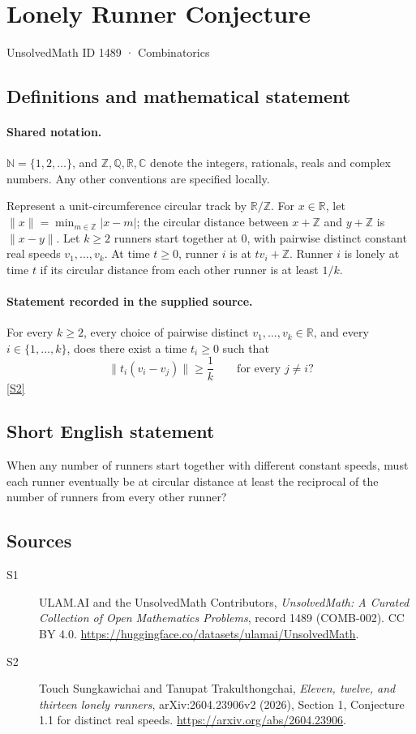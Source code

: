 \documentclass[11pt]{article}
\newcommand{\sref}[2]{\hyperlink{source:#1:#2}{[S#2]}}
\begin{document}
\setcounter{section}{1488}
\section{Lonely Runner Conjecture}\label{1489}
{\small\sffamily UnsolvedMath ID 1489 · Combinatorics}
\subsection{Definitions and mathematical statement}

\paragraph{Shared notation.}$\mathbb N=\{1,2,\ldots\}$, and $\mathbb Z,\mathbb Q,\mathbb R,\mathbb C$ denote the integers, rationals, reals and complex numbers. Any other conventions are specified locally.


Represent a unit-circumference circular track by \(\mathbb R/\mathbb Z\).
For \(x\in\mathbb R\), let \(\|x\|=\min_{m\in\mathbb Z}|x-m|\);
the circular distance between \(x+\mathbb Z\) and \(y+\mathbb Z\)
is \(\|x-y\|\). Let \(k\ge2\) runners start together at \(0\),
with pairwise distinct constant real speeds \(v_1,\ldots,v_k\).
At time \(t\ge0\), runner \(i\) is at \(tv_i+\mathbb Z\).
Runner \(i\) is lonely at time \(t\) if its circular distance from
each other runner is at least \(1/k\).
\paragraph{Statement recorded in the supplied source.}
For every \(k\ge2\), every choice of pairwise distinct
\(v_1,\ldots,v_k\in\mathbb R\), and every
\(i\in\{1,\ldots,k\}\), does there exist a time \(t_i\ge0\) such that
\[
          \|t_i(v_i-v_j)\|\ge\frac1k
                 \qquad\text{for every }j\ne i?
\] \sref{1489}{2}
\subsection{Short English statement}
When any number of runners start together with different constant speeds, must each runner eventually be at circular distance at least the reciprocal of the number of runners from every other runner?
\subsection{Sources}
\begin{description}
\item[\hypertarget{source:1489:1}{S1}] ULAM.AI and the UnsolvedMath Contributors, \emph{UnsolvedMath: A Curated Collection of Open Mathematics Problems}, record 1489 (COMB-002). CC BY 4.0. \url{https://huggingface.co/datasets/ulamai/UnsolvedMath}.
\item[\hypertarget{source:1489:2}{S2}] Touch Sungkawichai and Tanupat Trakulthongchai, \emph{Eleven, twelve, and thirteen lonely runners}, arXiv:2604.23906v2 (2026), Section 1, Conjecture 1.1 for distinct real speeds. \url{https://arxiv.org/abs/2604.23906}.
\end{description}
\label{end:1489}
\end{document}
